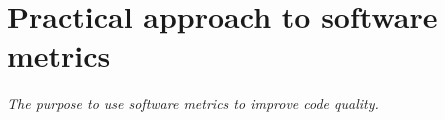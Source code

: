 \chapter{Practical approach to software metrics} \label{roz:metrics-practic}

\textit{The purpose to use software metrics to improve code quality.}

